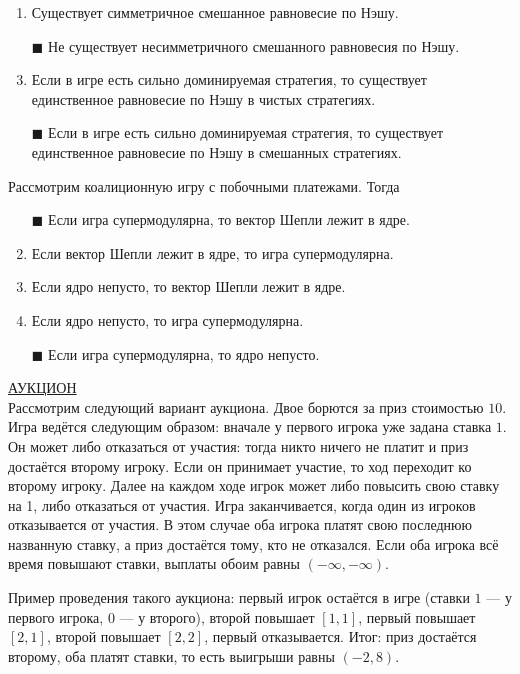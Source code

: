 \begin{enumerate}[label=$\square$]
	\item Существует симметричное смешанное равновесие по Нэшу.
	\item[$\blacksquare$] Не существует несимметричного смешанного равновесия по Нэшу.	
	\item Если в игре есть сильно доминируемая стратегия, то существует единственное равновесие по Нэшу в чистых стратегиях.
	\item[$\blacksquare$] Если в игре есть сильно доминируемая стратегия, то существует единственное равновесие по Нэшу в смешанных стратегиях.
\end{enumerate}

\task
Рассмотрим коалиционную игру с побочными платежами. Тогда

\begin{enumerate}[label=$\square$]	%
	\item[$\blacksquare$] Если игра супермодулярна, то вектор Шепли лежит в ядре.
	\item Если вектор Шепли лежит в ядре, то игра супермодулярна.
	\item Если ядро непусто, то вектор Шепли лежит в ядре.
	\item Если ядро непусто, то игра супермодулярна.
	\item[$\blacksquare$] Если игра супермодулярна, то ядро непусто.
\end{enumerate}

\task
\underline{АУКЦИОН} \\

Рассмотрим следующий вариант аукциона. Двое борются за приз стоимостью $10$. Игра ведётся следующим образом: вначале у первого игрока уже задана ставка $1$. Он может либо отказаться от участия: тогда никто ничего не платит и приз достаётся второму игроку. Если он принимает участие, то ход переходит ко второму игроку. Далее на каждом ходе игрок может либо повысить свою ставку на 1, либо отказаться от участия. Игра заканчивается, когда один из игроков отказывается от участия. В этом случае оба игрока платят свою последнюю названную ставку, а приз достаётся тому, кто не отказался. Если оба игрока всё время повышают ставки, выплаты обоим равны $(-\infty,-\infty)$.

Пример проведения такого аукциона: первый игрок остаётся в игре (ставки $1$ --- у первого игрока, $0$ --- у второго), второй повышает $[1,1]$, первый повышает $[2,1]$, второй повышает $[2,2]$, первый отказывается. Итог: приз достаётся второму, оба платят ставки, то есть выигрыши равны $(-2,8)$.

